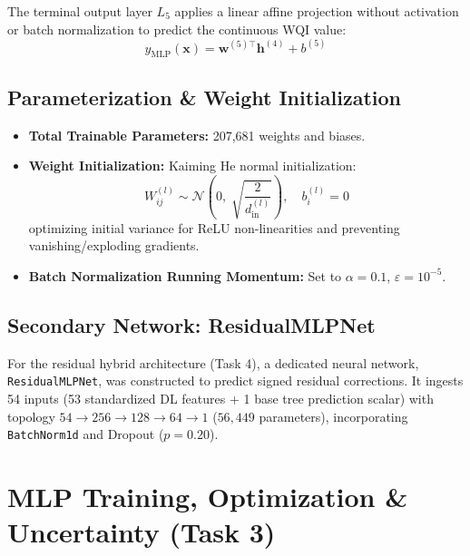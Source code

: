 \documentclass[conference]{IEEEtran}
\begin{document}
The terminal output layer $L_5$ applies a linear affine projection without activation or
batch normalization to predict the continuous WQI value:
\begin{equation}
  \hat{y}_{\text{MLP}}(\mathbf{x}) = \mathbf{w}^{(5)\top}\mathbf{h}^{(4)} + b^{(5)}
\end{equation}

\subsection{Parameterization \& Weight Initialization}
\begin{itemize}
  \item \textbf{Total Trainable Parameters:} 207,681 weights and biases.
  \item \textbf{Weight Initialization:} Kaiming He normal initialization:
        \begin{equation}
          W_{ij}^{(l)} \sim \mathcal{N}\!\left(0, \; \sqrt{\frac{2}{d_{\text{in}}^{(l)}}}\right), \quad b_i^{(l)} = 0
        \end{equation}
        optimizing initial variance for ReLU non-linearities and preventing vanishing/exploding gradients.
  \item \textbf{Batch Normalization Running Momentum:} Set to $\alpha = 0.1$, $\varepsilon = 10^{-5}$.
\end{itemize}

\subsection{Secondary Network: ResidualMLPNet}
For the residual hybrid architecture (Task 4), a dedicated neural network,
\texttt{ResidualMLPNet}, was constructed to predict signed residual corrections.
It ingests 54 inputs (53 standardized DL features + 1 base tree prediction scalar)
with topology $54 \to 256 \to 128 \to 64 \to 1$ ($56,449$ parameters),
incorporating \texttt{BatchNorm1d} and Dropout ($p = 0.20$).

\section{MLP Training, Optimization \& Uncertainty (Task 3)}
\label{sec:training}
\end{document}
